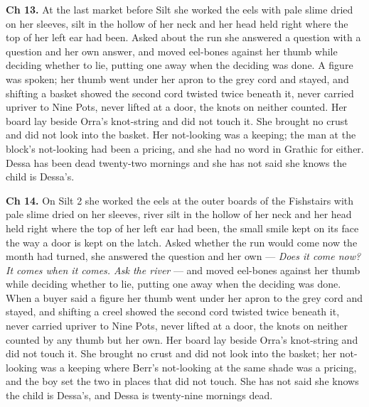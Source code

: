 \documentclass{design/chronicle}
\begin{document}
{\textbf{Ch 13.} At the last market before Silt she worked the eels with pale slime dried on her sleeves, silt in the hollow of her neck and her head held right where the top of her left ear had been. Asked about the run she answered a question with a question and her own answer, and moved eel-bones against her thumb while deciding whether to lie, putting one away when the deciding was done. A figure was spoken; her thumb went under her apron to the grey cord and stayed, and shifting a basket showed the second cord twisted twice beneath it, never carried upriver to Nine Pots, never lifted at a door, the knots on neither counted. Her board lay beside Orra’s knot-string and did not touch it. She brought no crust and did not look into the basket. Her not-looking was a keeping; the man at the block’s not-looking had been a pricing, and she had no word in Grathic for either. Dessa has been dead twenty-two mornings and she has not said she knows the child is Dessa’s.

\textbf{Ch 14.} On Silt 2 she worked the eels at the outer boards of the Fishstairs with pale slime dried on her sleeves, river silt in the hollow of her neck and her head held right where the top of her left ear had been, the small smile kept on its face the way a door is kept on the latch. Asked whether the run would come now the month had turned, she answered the question and her own — \emph{Does it come now? It comes when it comes. Ask the river} — and moved eel-bones against her thumb while deciding whether to lie, putting one away when the deciding was done. When a buyer said a figure her thumb went under her apron to the grey cord and stayed, and shifting a creel showed the second cord twisted twice beneath it, never carried upriver to Nine Pots, never lifted at a door, the knots on neither counted by any thumb but her own. Her board lay beside Orra’s knot-string and did not touch it. She brought no crust and did not look into the basket; her not-looking was a keeping where Berr’s not-looking at the same shade was a pricing, and the boy set the two in places that did not touch. She has not said she knows the child is Dessa’s, and Dessa is twenty-nine mornings dead.

}
\end{document}
